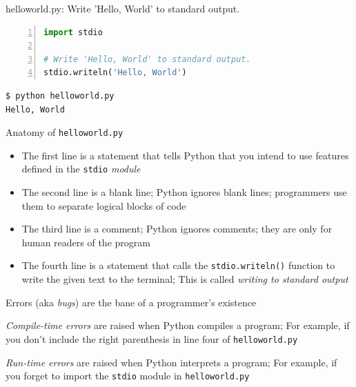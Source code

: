 \documentclass[8pt,a4paper,compress]{beamer}
\begin{document}
\begin{frame}[fragile]
\begin{framed}
\tiny helloworld.py: Write 'Hello, World' to standard output.
\end{framed}

\begin{lstlisting}[language=Python,numbers=left]
import stdio

# Write 'Hello, World' to standard output.
stdio.writeln('Hello, World')
\end{lstlisting}

\begin{lstlisting}[language={}]
$ python helloworld.py 
Hello, World
\end{lstlisting}

\bigskip

Anatomy of \lstinline{helloworld.py}
\begin{itemize}
\item The first line is a statement that tells Python that you intend to use features defined in the \lstinline{stdio} \emph{module}
 
\item The second line is a blank line; Python ignores blank lines; programmers use them to separate logical blocks of code

\item The third line is a comment; Python ignores comments; they are only for human readers of the program

\item The fourth line is a statement that calls the \lstinline{stdio.writeln()} function to write the given text to the terminal; This is called \emph{writing to standard output}
\end{itemize}
\end{frame}

\begin{frame}[fragile]
Errors (aka \emph{bugs}) are the bane of a programmer's existence

\bigskip

\emph{Compile-time errors} are raised when Python compiles a program; For example, if you don't include the right parenthesis in line four of \lstinline{helloworld.py}

\bigskip

\emph{Run-time errors} are raised when Python interprets a program; For example, if you forget to import the \lstinline{stdio} module in \lstinline{helloworld.py}
\end{frame}
\end{document}
